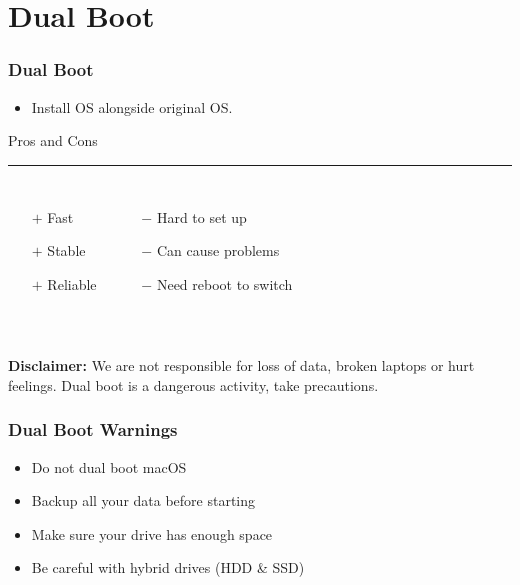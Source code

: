 \section{Dual Boot}
\begin{frame}
	\frametitle{Dual Boot}
    
    \begin{itemize}
    	\item Install OS alongside original OS.
    \end{itemize} \vspace{0.5cm}
    
    Pros and Cons \vspace{0.1cm}
    \hrule 
    \begin{columns}[c]
            \begin{enumerate}
           		\item[$+$] Fast
            	\item[$+$] Stable
                \item[$+$] Reliable
            \end{enumerate}
            \begin{enumerate}
            	\item[$-$] Hard to set up
                \item[$-$] Can cause problems
                \item[$-$] Need reboot to switch
            \end{enumerate}
    \end{columns} \vspace{0.5cm}
    
     \\
    \vspace{0.5cm}
    \textbf{Disclaimer:} We are not responsible for loss of data, broken laptops or hurt feelings. Dual boot is a dangerous activity, take precautions.
    
\end{frame}

\begin{frame}
	\frametitle{Dual Boot Warnings}
	
	\begin{itemize}
		\setlength\itemsep{\fill}
		\item Do not dual boot macOS
		\item Backup all your data before starting
		\item Make sure your drive has enough space
		\item Be careful with hybrid drives (HDD \& SSD)
	\end{itemize}
\end{frame}

